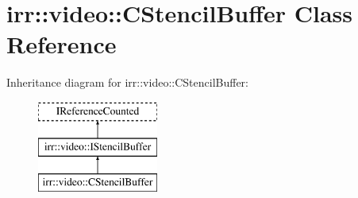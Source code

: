 \hypertarget{classirr_1_1video_1_1_c_stencil_buffer}{\section{irr\-:\-:video\-:\-:C\-Stencil\-Buffer Class Reference}
\label{classirr_1_1video_1_1_c_stencil_buffer}
}
Inheritance diagram for irr\-:\-:video\-:\-:C\-Stencil\-Buffer\-:\begin{figure}[H]
\begin{center}
\leavevmode
\includegraphics[height=3.000000cm]{classirr_1_1video_1_1_c_stencil_buffer}
\end{center}
\end{figure}
